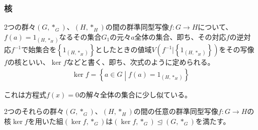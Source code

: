 \documentclass[dvipdfmx]{jsarticle}
\begin{document}
\subsubsection{核}%
\begin{dfn}
2つの群々$\left( G,*_{G} \right)$、$\left( H,*_{H} \right)$の間の群準同型写像$f:G \rightarrow H$について、$f(a) = 1_{\left( H,*_{H} \right)}$なるその集合$G_{1}$の元々$a$全体の集合、即ち、その対応$f$の逆対応$f^{- 1}$で始集合を$\left\{ 1_{\left( H,*_{H} \right)} \right\}$としたときの値域$V\left( f^{- 1}|\left\{ 1_{\left( H,*_{H} \right)} \right\} \right)$をその写像$f$の核といい、$\ker f$などと書く、即ち、次式のように定められる。
\begin{align*}
\ker f = \left\{ a \in G \middle| f(a) = 1_{\left( H,*_{H} \right)} \right\}
\end{align*}
\end{dfn}\par
これは方程式$f(x) = 0$の解々全体の集合に少し似ている。
\begin{thm}\label{3.1.2.6}
2つのそれらの群々$\left( G,*_{G} \right)$、$\left( H,*_{H} \right)$の間の任意の群準同型写像$f:G \rightarrow H$の核$\ker f$を用いた組$\left( \ker f,*_{G} \right)$は$\left( \ker f,*_{G} \right) \trianglelefteq \left( G,*_{G} \right)$を満たす。
\end{thm}
\end{document}
